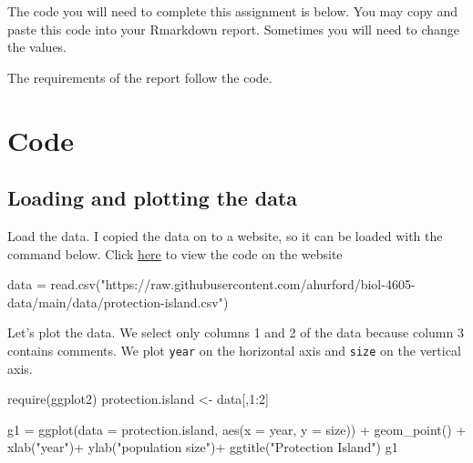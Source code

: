 \documentclass[
]{book}
\newenvironment{Shaded}{\begin{snugshade}}{\end{snugshade}}
\newcommand{\AttributeTok}[1]{\textcolor[rgb]{0.77,0.63,0.00}{#1}}
\newcommand{\DecValTok}[1]{\textcolor[rgb]{0.00,0.00,0.81}{#1}}
\newcommand{\FunctionTok}[1]{\textcolor[rgb]{0.00,0.00,0.00}{#1}}
\newcommand{\NormalTok}[1]{#1}
\newcommand{\OtherTok}[1]{\textcolor[rgb]{0.56,0.35,0.01}{#1}}
\newcommand{\SpecialCharTok}[1]{\textcolor[rgb]{0.00,0.00,0.00}{#1}}
\newcommand{\StringTok}[1]{\textcolor[rgb]{0.31,0.60,0.02}{#1}}
\begin{document}
The code you will need to complete this assignment is below. You may copy and paste this code into your Rmarkdown report. Sometimes you will need to change the values.

The requirements of the report follow the code.

\hypertarget{code}{%
\section{Code}\label{code}}

\hypertarget{loading-and-plotting-the-data}{%
\subsection{Loading and plotting the data}\label{loading-and-plotting-the-data}}

Load the data. I copied the data on to a website, so it can be loaded with the command below. Click \href{https://github.com/ahurford/biol-4605-data/blob/main/data/protection-island.csv}{here} to view the code on the website

\begin{Shaded}
\begin{Highlighting}[]
\NormalTok{data }\OtherTok{=} \FunctionTok{read.csv}\NormalTok{(}\StringTok{"https://raw.githubusercontent.com/ahurford/biol{-}4605{-}data/main/data/protection{-}island.csv"}\NormalTok{)}
\end{Highlighting}
\end{Shaded}

Let's plot the data. We select only columns 1 and 2 of the data because column 3 contains comments. We plot \texttt{year} on the horizontal axis and \texttt{size} on the vertical axis.

\begin{Shaded}
\begin{Highlighting}[]
\FunctionTok{require}\NormalTok{(ggplot2)}
\NormalTok{protection.island }\OtherTok{\textless{}{-}}\NormalTok{ data[,}\DecValTok{1}\SpecialCharTok{:}\DecValTok{2}\NormalTok{]}

\NormalTok{g1 }\OtherTok{=} \FunctionTok{ggplot}\NormalTok{(}\AttributeTok{data =}\NormalTok{ protection.island, }\FunctionTok{aes}\NormalTok{(}\AttributeTok{x =}\NormalTok{ year, }\AttributeTok{y =}\NormalTok{ size)) }\SpecialCharTok{+} 
  \FunctionTok{geom\_point}\NormalTok{() }\SpecialCharTok{+}
  \FunctionTok{xlab}\NormalTok{(}\StringTok{"year"}\NormalTok{)}\SpecialCharTok{+}
  \FunctionTok{ylab}\NormalTok{(}\StringTok{"population size"}\NormalTok{)}\SpecialCharTok{+}
  \FunctionTok{ggtitle}\NormalTok{(}\StringTok{"Protection Island"}\NormalTok{)}
\NormalTok{g1}
\end{Highlighting}
\end{Shaded}
\end{document}
